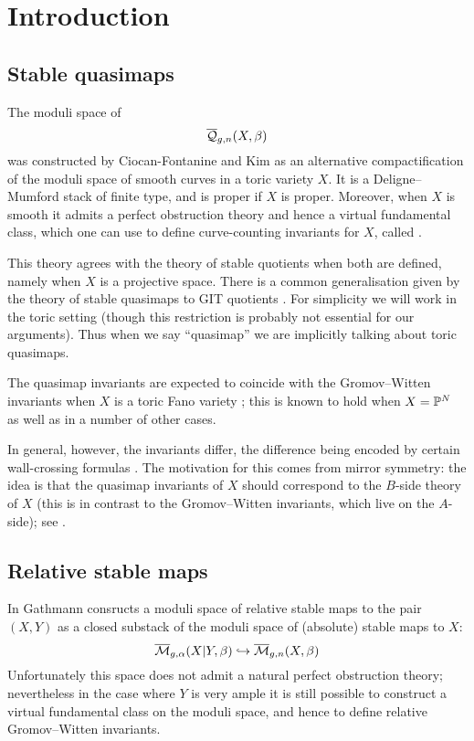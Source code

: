\section{Introduction}

\subsection{Stable quasimaps}
The moduli space of 
\begin{equation*} \overline{\mathcal Q}_{g,n}(X,\beta) \end{equation*}
was constructed by Ciocan-Fontanine and Kim \cite{CF-K} as an alternative compactification of the moduli space of smooth curves in a toric variety $X$. It is a Deligne--Mumford stack of finite type, and is proper if $X$ is proper. Moreover, when $X$ is smooth it admits a perfect obstruction theory and hence a virtual fundamental class, which one can use to define curve-counting invariants for $X$, called .

This theory agrees with the theory of stable quotients \cite{MOP} when both are defined, namely when $X$ is a projective space.  There is a common generalisation given by the theory of stable quasimaps to GIT quotients \cite{CFKM}. For simplicity we will work in the toric setting (though this restriction is probably not essential for our arguments). Thus when we say ``quasimap'' we are implicitly talking about toric quasimaps.

The quasimap invariants are expected to coincide with the Gromov--Witten invariants when $X$ is a toric Fano variety \cite{CM}; this is known to hold when $X=\mathbb P^N$ as well as in a number of other cases.

In general, however, the invariants differ, the difference being encoded by certain wall-crossing formulas \cite{CF-K-wallcrossing}. The motivation for this comes from mirror symmetry: the idea is that the quasimap invariants of $X$ should correspond to the $B$-side theory of $X$ (this is in contrast to the Gromov--Witten invariants, which live on the $A$-side); see \cite[\S 7]{CF-K}.

\subsection{Relative stable maps}
In \cite{Ga} Gathmann consructs a moduli space of relative stable maps to the pair $(X,Y)$ as a closed substack of the moduli space of (absolute) stable maps to $X$:
\begin{equation*} \overline{\mathcal M}_{g,\alpha}(X|Y,\beta) \hookrightarrow \overline{\mathcal M}_{g,n}(X,\beta) \end{equation*}
Unfortunately this space does not admit a natural perfect obstruction theory; nevertheless in the case where $Y$ is very ample it is still possible to construct a virtual fundamental class on the moduli space, and hence to define relative Gromov--Witten invariants.

